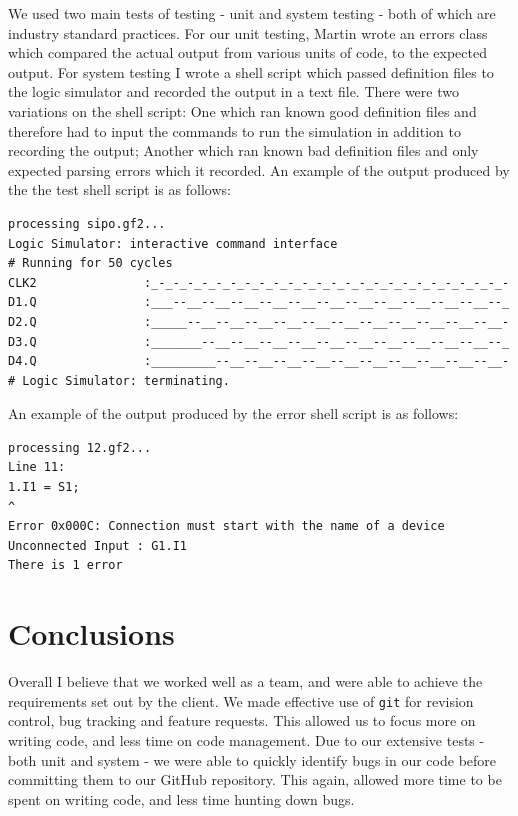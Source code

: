 \documentclass[a4paper,10pt]{article}
\begin{document}
We used two main tests of testing - unit and system testing - both of which are industry standard practices. For our unit testing, Martin wrote an errors class which compared the actual output from various units of code, to the expected output. For system testing I wrote a shell script which passed definition files to the logic simulator and recorded the output in a text file. There were two variations on the shell script: One which ran known good definition files and therefore had to input the commands to run the simulation in addition to recording the output; Another which ran known bad definition files and only expected parsing errors which it recorded. An example of the output produced by the the test shell script is as follows:
\pagebreak
\begin{verbatim}
processing sipo.gf2...
Logic Simulator: interactive command interface
# Running for 50 cycles
CLK2               :_-_-_-_-_-_-_-_-_-_-_-_-_-_-_-_-_-_-_-_-_-_-_-_-_-
D1.Q               :___--__--__--__--__--__--__--__--__--__--__--__--_
D2.Q               :_____--__--__--__--__--__--__--__--__--__--__--__-
D3.Q               :_______--__--__--__--__--__--__--__--__--__--__--_
D4.Q               :_________--__--__--__--__--__--__--__--__--__--__-
# Logic Simulator: terminating.
\end{verbatim}

An example of the output produced by the error shell script is as follows:

\begin{verbatim}
processing 12.gf2...
Line 11:
1.I1 = S1;
^
Error 0x000C: Connection must start with the name of a device
Unconnected Input : G1.I1
There is 1 error
\end{verbatim}


\section{Conclusions}

Overall I believe that we worked well as a team, and were able to achieve the requirements set out by the client. We made effective use of \texttt{git} for revision control, bug tracking and feature requests. This allowed us to focus more on writing code, and less time on code management. Due to our extensive tests - both unit and system - we were able to quickly identify bugs in our code before committing them to our GitHub repository. This again, allowed more time to be spent on writing code, and less time hunting down bugs. 
\end{document}
